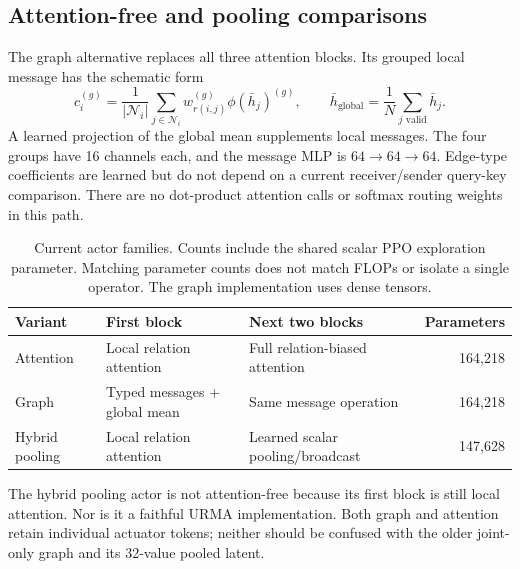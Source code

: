 \documentclass[11pt,letterpaper]{article}
\begin{document}
\subsection{Attention-free and pooling comparisons}
The graph alternative replaces all three attention blocks. Its grouped local
message has the schematic form
\begin{equation}
 c_i^{(g)}=\frac{1}{|\mathcal N_i|}
   \sum_{j\in\mathcal N_i}w_{r(i,j)}^{(g)}
             \phi(\bar h_j)^{(g)},
 \qquad
 \bar h_{\mathrm{global}}=\frac{1}{N}\sum_{j\text{ valid}}\bar h_j.
 \label{eq:message}
\end{equation}
A learned projection of the global mean supplements local messages. The four
groups have 16 channels each, and the message MLP is
$64\rightarrow64\rightarrow64$. Edge-type coefficients are learned but do not
depend on a current receiver/sender query-key comparison. There are no dot-product
attention calls or softmax routing weights in this path.

\begin{table}[htbp]
\centering\small
\begin{tabularx}{\linewidth}{@{}lYYr@{}}
\toprule
Variant & First block & Next two blocks & Parameters\\
\midrule
Attention & Local relation attention & Full relation-biased attention & 164,218\\
Graph & Typed messages + global mean & Same message operation & 164,218\\
Hybrid pooling & Local relation attention & Learned scalar pooling/broadcast & 147,628\\
\bottomrule
\end{tabularx}
\caption{Current actor families. Counts include the shared scalar PPO exploration
parameter. Matching parameter counts does not match FLOPs or isolate a single
operator. The graph implementation uses dense tensors.}
\end{table}

The hybrid pooling actor is not attention-free because its first block is still
local attention. Nor is it a faithful URMA implementation. Both graph and
attention retain individual actuator tokens; neither should be confused with the
older joint-only graph and its 32-value pooled latent.
\end{document}
